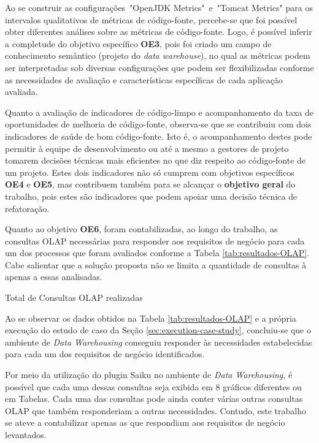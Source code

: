 Ao se construir as  configurações~"OpenJDK Metrics"~e~"Tomcat Metrics" para os intervalos qualitativos de métricas de código-fonte, percebe-se que foi possível obter diferentes análises sobre as métricas de código-fonte. Logo, é possível inferir a completude do objetivo específico \textbf{OE3}, pois foi criado um campo de conhecimento semântico (projeto do \textit{data warehouse}), no qual as métricas podem ser interpretadas sob diversas configurações que podem ser flexibilizadas conforme as necessidades de avaliação e características específicas de cada aplicação avaliada.

Quanto a avaliação de indicadores de código-limpo e acompanhamento da taxa de oportunidades de melhoria de código-fonte, observa-se que se contribuiu com dois indicadores de saúde de bom código-fonte. Isto é, o acompanhamento destes pode permitir à equipe de desenvolvimento ou até a mesmo a gestores de projeto tomarem decisões técnicas mais eficientes no que diz respeito ao código-fonte de um projeto. Estes dois indicadores não só cumprem com objetivos específicos \textbf{OE4} e \textbf{OE5}, mas contribuem também para se alcançar o \textbf{objetivo geral} do trabalho, pois estes são indicadores que podem apoiar uma decisão técnica de refatoração.

Quanto ao objetivo \textbf{OE6}, foram contabilizadas, ao longo do trabalho, as consultas OLAP necessárias para responder aos requisitos de negócio para cada um dos processos que foram avaliados conforme a Tabela \ref{tab:resultados-OLAP}. Cabe salientar que a solução proposta não se limita a quantidade de consultas à apenas a essas analisadas.

 
\begin{table}[H]
\begin{center}

\caption{Total de Consultas OLAP realizadas}
\label{tab:resultados-OLAP}
\end{center}
\end{table}
\FloatBarrier


Ao se observar os dados obtidos na Tabela \ref{tab:resultados-OLAP} e a própria execução do estudo de caso da Seção \ref{sec:execution-case-study}, concluiu-se que o ambiente de \textit{Data Warehousing} conseguiu responder às necessidades estabelecidas para cada um dos requisitos de negócio identificados. 

Por meio da utilização do plugin Saiku no ambiente de \textit{Data Warehousing}, é possível que cada uma dessas consultas seja exibida em 8 gráficos diferentes ou em Tabelas. Cada uma das consultas pode ainda conter várias outras consultas OLAP que também responderiam a outras necessidades. Contudo, este trabalho se ateve a contabilizar apenas as que respondiam aos requisitos de negócio levantados.

